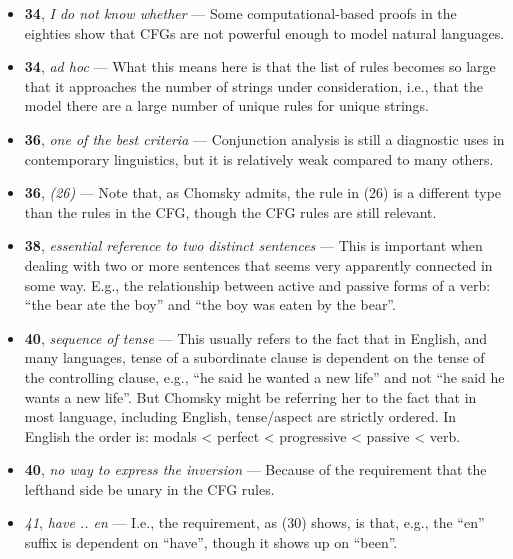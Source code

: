 \documentclass[12pt]{article}
\begin{document}
\begin{itemize}

\item \textbf{34}, \textit{I do not know whether} --- Some computational-based proofs in the eighties show that CFGs are not powerful enough to model natural languages.

\item \textbf{34}, \textit{ad hoc} --- What this means here is that the list of rules becomes so large that it approaches the number of strings under consideration, i.e., that the model there are a large number of unique rules for unique strings.

\item \textbf{36}, \textit{one of the best criteria} --- Conjunction analysis is still a diagnostic uses in contemporary linguistics, but it is relatively weak compared to many others.

\item \textbf{36}, \textit{(26)} --- Note that, as Chomsky admits, the rule in (26) is a different type than the rules in the CFG, though the CFG rules are still relevant.

\item \textbf{38}, \textit{essential reference to two distinct sentences} --- This is important when dealing with two or more sentences that seems very apparently connected in some way. E.g., the relationship between active and passive forms of a verb: ``the bear ate the boy'' and ``the boy was eaten by the bear''.

\item \textbf{40}, \textit{sequence of tense} --- This usually refers to the fact that in English, and many languages, tense of a subordinate clause is dependent on the tense of the controlling clause, e.g., ``he said he wanted a new life'' and not ``he said he wants a new life''. But Chomsky might be referring her to the fact that in most language, including English, tense/aspect are strictly ordered. In English the order is: modals < perfect < progressive < passive < verb.

\item \textbf{40}, \textit{no way to express the inversion} --- Because of the requirement that the lefthand side be unary in the CFG rules.

\item \textit{41}, \textit{have .. en} --- I.e., the requirement, as (30) shows, is that, e.g., the ``en'' suffix is dependent on ``have'', though it shows up on ``been''.


\end{itemize}
\end{document}
